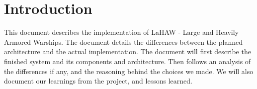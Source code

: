 \chapter{Introduction}

This document describes the implementation of LaHAW - Large and Heavily Armored Warships. The document details the differences between the planned architecture and the actual implementation. The document will first describe the finished system and its components and architecture. Then follows an analysis of the differences if any, and the reasoning behind the choices we made. We will also document our learnings from the project, and lessons learned. 